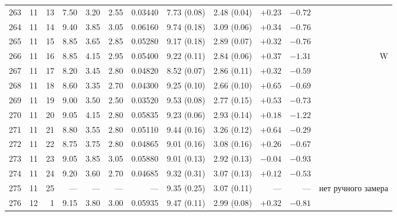 \begin{longtable}{@{}rrrrrrrrrrrr@{}}
263 & 11 & 13 & \num{7.50} & \num{3.20} & \num{2.55} & \num{0.03440} & \num{7.73} (\num{0.08}) & \num{2.48} (\num{0.04}) & $+\num{0.23}$ & $-\num{0.72}$ &  \\
264 & 11 & 14 & \num{9.40} & \num{3.85} & \num{3.05} & \num{0.06160} & \num{9.74} (\num{0.18}) & \num{3.09} (\num{0.06}) & $+\num{0.34}$ & $-\num{0.76}$ &  \\
265 & 11 & 15 & \num{8.85} & \num{3.65} & \num{2.85} & \num{0.05280} & \num{9.17} (\num{0.18}) & \num{2.89} (\num{0.07}) & $+\num{0.32}$ & $-\num{0.76}$ &  \\
266 & 11 & 16 & \num{8.85} & \num{4.15} & \num{2.95} & \num{0.05400} & \num{9.22} (\num{0.11}) & \num{2.84} (\num{0.06}) & $+\num{0.37}$ & $-\num{1.31}$ & W \\
267 & 11 & 17 & \num{8.20} & \num{3.45} & \num{2.80} & \num{0.04820} & \num{8.52} (\num{0.07}) & \num{2.86} (\num{0.11}) & $+\num{0.32}$ & $-\num{0.59}$ &  \\
268 & 11 & 18 & \num{8.60} & \num{3.35} & \num{2.70} & \num{0.04300} & \num{9.25} (\num{0.10}) & \num{2.66} (\num{0.10}) & $+\num{0.65}$ & $-\num{0.69}$ &  \\
269 & 11 & 19 & \num{9.00} & \num{3.50} & \num{2.50} & \num{0.03520} & \num{9.53} (\num{0.08}) & \num{2.77} (\num{0.15}) & $+\num{0.53}$ & $-\num{0.73}$ &  \\
270 & 11 & 20 & \num{9.05} & \num{4.15} & \num{2.80} & \num{0.05835} & \num{9.23} (\num{0.06}) & \num{2.93} (\num{0.14}) & $+\num{0.18}$ & $-\num{1.22}$ &  \\
271 & 11 & 21 & \num{8.80} & \num{3.55} & \num{2.80} & \num{0.05110} & \num{9.44} (\num{0.16}) & \num{3.26} (\num{0.12}) & $+\num{0.64}$ & $-\num{0.29}$ &  \\
272 & 11 & 22 & \num{8.75} & \num{3.75} & \num{2.80} & \num{0.04865} & \num{9.01} (\num{0.16}) & \num{3.08} (\num{0.16}) & $+\num{0.26}$ & $-\num{0.67}$ &  \\
273 & 11 & 23 & \num{9.05} & \num{3.85} & \num{3.05} & \num{0.05880} & \num{9.01} (\num{0.13}) & \num{2.92} (\num{0.13}) & $-\num{0.04}$ & $-\num{0.93}$ &  \\
274 & 11 & 24 & \num{9.20} & \num{3.60} & \num{2.70} & \num{0.04685} & \num{9.32} (\num{0.31}) & \num{3.07} (\num{0.13}) & $+\num{0.12}$ & $-\num{0.53}$ &  \\
275 & 11 & 25 & --- & --- & --- & --- & \num{9.35} (\num{0.25}) & \num{3.07} (\num{0.11}) & --- & --- & нет ручного замера \\
276 & 12 & 1 & \num{9.15} & \num{3.80} & \num{3.00} & \num{0.05935} & \num{9.47} (\num{0.11}) & \num{2.99} (\num{0.08}) & $+\num{0.32}$ & $-\num{0.81}$ &  \\

\end{longtable}
